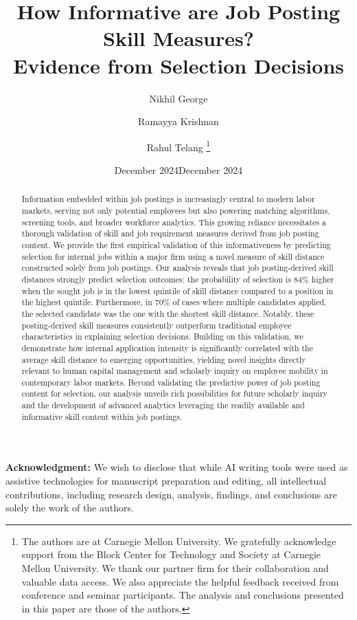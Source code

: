 \documentclass[letterpaper,11pt,leqno]{article}
\newcommand{\bib}{references.bib}
\begin{document}
\title{How Informative are Job Posting Skill Measures? \\ Evidence from Selection Decisions}

\ifanonymous
\date{December 2024}
\else
\author{%
Nikhil George \and
Ramayya Krishnan \and
Rahul Telang%
\thanks{The authors are at Carnegie Mellon University. We gratefully acknowledge support from the Block Center for Technology and Society at Carnegie Mellon University. We thank our partner firm for their collaboration and valuable data access. We also appreciate the helpful feedback received from conference and seminar participants. The analysis and conclusions presented in this paper are those of the authors.}%
}
\date{December 2024}
\fi

\begin{titlepage}
\maketitle

\begin{abstract}
Information embedded within job postings is increasingly central to modern labor markets, serving not only potential employees but also 
powering matching algorithms, screening tools, and broader workforce analytics. This growing reliance necessitates a thorough validation of 
skill and job requirement measures derived from job posting content. We provide the first empirical validation of this informativeness by 
predicting selection for internal jobs within a major firm using a novel measure of skill distance constructed solely from job postings. 
Our analysis reveals that job posting-derived skill distances strongly predict selection outcomes: the probability of selection is 84\% 
higher when the sought job is in the lowest quintile of skill distance compared to a position in the highest quintile. Furthermore, in 70\% 
of cases where multiple candidates applied, the selected candidate was the one with the shortest skill distance. Notably, these posting-derived 
skill measures consistently outperform traditional employee characteristics in explaining selection decisions. Building on this validation, 
we demonstrate how internal application intensity is significantly correlated with the average skill distance to emerging opportunities, 
yielding novel insights directly relevant to human capital management and scholarly inquiry on employee mobility in contemporary labor markets. 
Beyond validating the predictive power of job posting content for selection, our analysis unveils rich possibilities for future scholarly 
inquiry and the development of advanced analytics leveraging the readily available and informative skill content within job postings.
\end{abstract}

\ifanonymous
\vspace{1em}
\noindent\textbf{Acknowledgment:} We wish to disclose that while AI writing tools were used as assistive technologies for manuscript 
preparation and editing, all intellectual contributions, including research design, analysis, findings, and conclusions are solely the work of the authors.
\fi

\end{titlepage}










\end{document}
